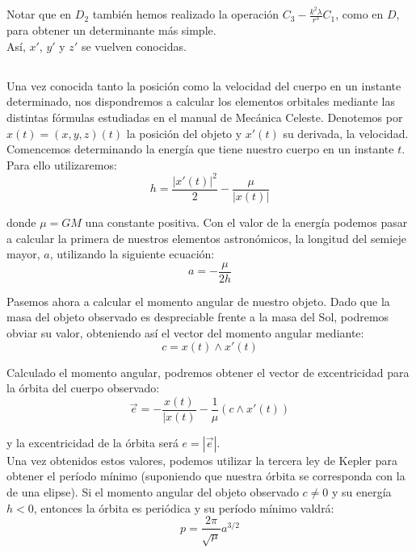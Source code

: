 \documentclass[11pt]{article}
\begin{document}
Notar que en $D_2$ también hemos realizado la operación $C_3-\frac{k^2\lambda}{r^3}C_1$, como en $D$, para obtener un determinante más simple.\\

Así, $x'$, $y'$ y $z'$ se vuelven conocidas.\\

\subsection{}
\label{subsec:elements_determination}
Una vez conocida tanto la posición como la velocidad del cuerpo en un instante determinado, nos dispondremos a calcular los elementos orbitales mediante las distintas fórmulas estudiadas en el manual de Mecánica Celeste\cite{ortega}. Denotemos por $x(t)=(x,y,z)(t)$ la posición del objeto y $x'(t)$ su derivada, la velocidad.\\

Comencemos determinando la energía que tiene nuestro cuerpo en un instante $t$. Para ello utilizaremos:
\[
h=\frac{|x'(t)|^2}{2}-\frac{\mu}{|x(t)|}
\]

\noindent donde $\mu=GM$ una constante positiva. Con el valor de la energía podemos pasar a calcular la primera de nuestros elementos astronómicos, la longitud del semieje mayor, $a$, utilizando la siguiente ecuación:
\[
a=-\frac{\mu}{2h}
\]

Pasemos ahora a calcular el momento angular de nuestro objeto. Dado que la masa del objeto observado es despreciable frente a la masa del Sol, podremos obviar su valor, obteniendo así el vector del momento angular mediante:
\[
c=x(t)\wedge x'(t)
\]

Calculado el momento angular, podremos obtener el vector de excentricidad para la órbita del cuerpo observado:
\[
\vec{e}=-\frac{x(t)}{|x(t)}-\frac{1}{\mu}(c\wedge x'(t))
\]

\noindent y la excentricidad de la órbita será $e=|\vec{e}|$.\\

Una vez obtenidos estos valores, podemos utilizar la tercera ley de Kepler para obtener el período mínimo (suponiendo que nuestra órbita se corresponda con la de una elipse). Si el momento angular del objeto observado $c\neq0$ y su energía $h<0$, entonces la órbita es periódica y su período mínimo valdrá:
\[
p=\frac{2\pi}{\sqrt{\mu}}a^{3/2}
\]
\end{document}
